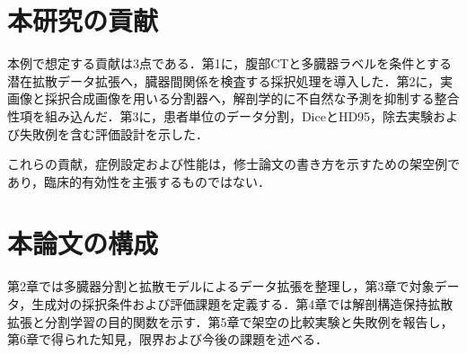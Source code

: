 \section{本研究の貢献}

本例で想定する貢献は3点である．第1に，腹部CTと多臓器ラベルを条件とする潜在拡散データ拡張へ，臓器間関係を検査する採択処理を導入した．第2に，実画像と採択合成画像を用いる分割器へ，解剖学的に不自然な予測を抑制する整合性項を組み込んだ．第3に，患者単位のデータ分割，DiceとHD95，除去実験および失敗例を含む評価設計を示した．

これらの貢献，症例設定および性能は，修士論文の書き方を示すための架空例であり，臨床的有効性を主張するものではない．

\section{本論文の構成}

第2章では多臓器分割と拡散モデルによるデータ拡張を整理し，第3章で対象データ，生成対の採択条件および評価課題を定義する．第4章では解剖構造保持拡散拡張と分割学習の目的関数を示す．第5章で架空の比較実験と失敗例を報告し，第6章で得られた知見，限界および今後の課題を述べる．
